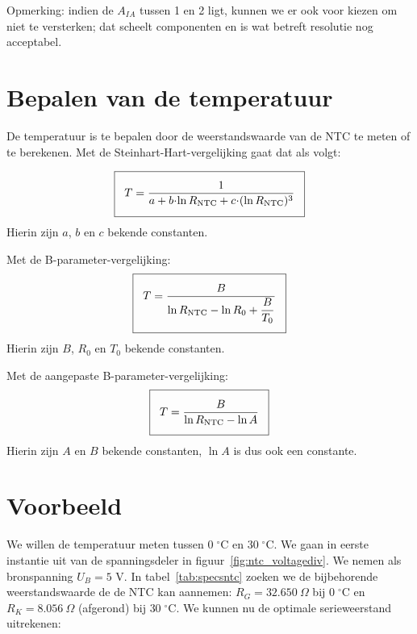 \documentclass[12pt,a4paper,final,twoside,fleqn]{article}
\newcommand{\mathcelc}[1]{\mbox{$#1\;^\circ\text{C}$}}
\newcommand{\rntc}{R_\text{NTC}}
\let\oldcdot\cdot
\renewcommand{\cdot}{\kern-.10em\oldcdot\kern-.10em}
\begin{document}
Opmerking: indien de $A_{IA}$ tussen 1 en 2 ligt, kunnen we er ook voor kiezen
om niet te versterken; dat scheelt componenten en is wat betreft resolutie nog
acceptabel.



\clearpage
\section{Bepalen van de temperatuur}
De temperatuur is te bepalen door de weerstandswaarde van de NTC te meten of te
berekenen.
Met de Steinhart-Hart-vergelijking gaat dat als volgt:

\begin{equation}
\label{equ:invertedsteinharthart}
\setlength\fboxsep{2ex}
\boxed{T = \dfrac{1}{a + b\cdot\ln \rntc + c\cdot( \ln \rntc )^3}}
\end{equation}
Hierin zijn $a$, $b$ en $c$ bekende constanten.

Met de B-parameter-vergelijking:
\begin{equation}
\label{equ:invertedsteinharthartsimpl}
\setlength\fboxsep{2ex}
\boxed{T = \dfrac{B}{\ln \rntc - \ln R_0 + \dfrac{B}{T_0}}}
\end{equation}
Hierin zijn $B$, $R_0$ en $T_0$ bekende constanten.


Met de aangepaste B-parameter-vergelijking:
\begin{equation}
\label{equ:invertedsteinharthartadapt}
\setlength\fboxsep{2ex}
\boxed{T = \dfrac{B}{\ln \rntc - \ln A}}
\end{equation}
Hierin zijn $A$ en $B$ bekende constanten, $\ln A$ is dus ook een constante.



\clearpage
\section{Voorbeeld}
\label{sec:voorbeeld}
We willen de temperatuur meten tussen \mathcelc{0} en \mathcelc{30}. We gaan in
eerste instantie uit van de spanningsdeler in figuur~\ref{fig:ntc_voltagediv}.
We nemen als bronspanning $U_B=5$ V. In
tabel~\ref{tab:specsntc} zoeken we de bijbehorende weerstandswaarde de de NTC
kan aannemen: $R_G=32.650\ \Omega$ bij \mathcelc{0} en $R_K= 8.056\ \Omega$
(afgerond) bij \mathcelc{30}. We kunnen nu de optimale serieweerstand uitrekenen:
\end{document}

